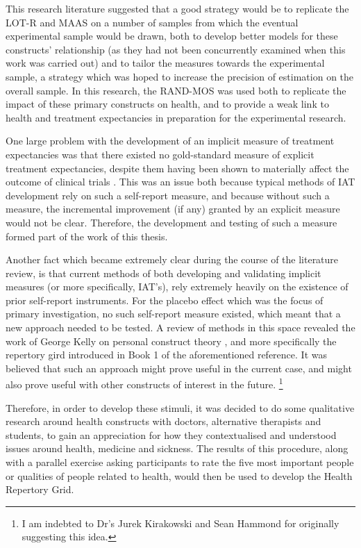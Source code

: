 This research literature suggested that a good strategy would be to replicate the LOT-R and MAAS on a number of samples from which the eventual experimental sample would be drawn, both to develop better models for these constructs' relationship (as they had not been concurrently examined when this work was carried out) and to tailor the measures towards the experimental sample, a strategy which was hoped to increase the precision of estimation on the overall sample. In this research, the RAND-MOS was used both to replicate the impact of these primary constructs on health, and to provide a weak link to health and treatment expectancies in preparation for the experimental research. 

One large problem with the development of an implicit measure of treatment expectancies was that there existed no gold-standard measure of explicit treatment expectancies, despite them having been shown to materially affect the outcome of clinical trials \cite{Linde2007,Bausell2005,Benedetti2005}. This was an issue both because typical methods of IAT development rely on such a self-report measure, and because without such a measure, the incremental improvement (if any) granted by an explicit measure would not be clear. Therefore, the development and testing of such a measure formed part of the work of this thesis. 

Another fact which became extremely clear during the course of the literature review, is that current methods of both developing and validating implicit measures (or more specifically, IAT's), rely extremely heavily on the existence of prior self-report instruments. For the placebo effect which was the focus of primary investigation, no such self-report measure existed, which meant that a new approach needed to be tested. A review of methods in this space revealed the work of George Kelly on personal construct theory \cite{Kelly1991}, and more specifically the repertory gird introduced in Book 1 of the aforementioned reference. It was believed that such an approach might prove useful in the current case, and might also prove useful with other constructs of interest in the future. \footnote{I am indebted to Dr's Jurek Kirakowski and Sean Hammond for originally suggesting this idea.}

Therefore, in order to develop these stimuli, it was decided to do some qualitative research around health constructs with doctors, alternative therapists and students, to gain an appreciation for how they contextualised and understood issues around health, medicine and sickness. The results of this procedure, along with a parallel exercise asking participants to rate the five most important people or qualities of people related to health, would then be used to develop the Health Repertory Grid. 

